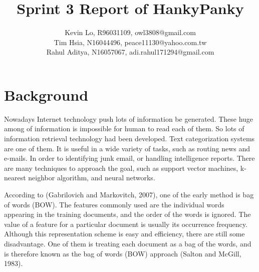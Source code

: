 \documentclass[a4paper,twocolumn]{article} %
\begin{document}

\title{Sprint 3 Report of HankyPanky}
\author{Kevin Lo, R96031109, owl3808@gmail.com \\ Tim Hsia, N16044496, peace11130@yahoo.com.tw \\ Rahul Aditya, N16057067, adi.rahul171294@gmail.com}

\maketitle                     %





\section*{Background}
\label{sec:prob}

Nowadays Internet technology push lots of information be generated. These huge among of information is impossible for human to read each of them. So lots of information retrieval technology had been developed. Text categorization systems are one of them. It is useful in a wide variety of tasks, such as routing news and e-mails. In order to identifying junk email, or handling intelligence reports. There are many techniques to approach the goal, such as support vector machines, k-nearest neighbor algorithm, and neural networks.
  
According to (Gabrilovich and  Markovitch, 2007), one of the early method is bag of words (BOW). The features commonly used are the individual words appearing in the training documents, and the order of the words is ignored. The value of a feature for a particular document is usually its occurrence frequency. Although this representation scheme is easy and efficiency,  there are still some disadvantage. One of them is treating each document as a bag of the words, and is therefore known as the bag of words (BOW) approach (Salton and McGill, 1983).
  
\end{document}
